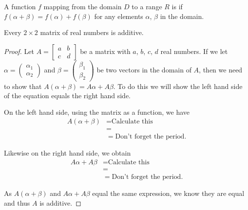 \documentclass{amsart}
\begin{document}


\begin{defn*}
	A function $f$ mapping from the domain $D$ to a range $R$ is  if $f(\alpha+\beta) = f(\alpha)+f(\beta)$ for any elements $\alpha$, $\beta$ in the domain. 
\end{defn*}

\begin{prop*}
	Every $2\times 2$ matrix of real numbers is additive. 
\end{prop*}
\begin{proof}
	
	Let $A = \begin{bmatrix}
		a & b \\
		c & d
	\end{bmatrix}$ be a matrix with $a$, $b$, $c$, $d$ real numbers. If we let $\alpha = \begin{pmatrix}
		\alpha_1 \\
		\alpha_2
	\end{pmatrix}$ and $\beta = \begin{pmatrix}
		\beta_1 \\
		\beta_2
	\end{pmatrix}$ be two vectors in the domain of $A$, then we need to show that $A(\alpha + \beta) = A\alpha + A\beta$. To do this we will show the left hand side of the equation equals the right hand side. 

	On the left hand side, using the matrix as a function, we have 
	\begin{align*}
		A(\alpha + \beta) & = \text{Calculate this} \\
			& =  \\
			& = \text{Don't forget the period}.
	\end{align*}

	Likewise on the right hand side, we obtain
	\begin{align*}
		A\alpha + A\beta & = \text{Calculate this} \\
			& =  \\
			& = \text{Don't forget the period}.
	\end{align*}	

	As $A(\alpha + \beta)$ and $A\alpha + A\beta$ equal the same expression, we know they are equal and thus $A$ is additive. 
\end{proof}
\end{document}
